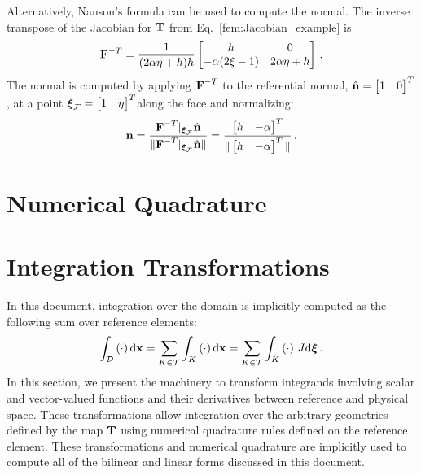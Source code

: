 \documentclass[../doc.tex]{subfiles}
\begin{document}
Alternatively, Nanson's formula can be used to compute the normal. The inverse transpose of the Jacobian for $\boldsymbol{\mathrm{T}}$ from Eq.~\ref{fem:Jacobian_example} is 
	\begin{equation}
		\boldsymbol{\mathrm{F}}^{-T} = \frac{1}{(2\alpha \eta + h)h} \begin{bmatrix} 
			h & 0 \\ 
			-\alpha(2\xi-1) & 2\alpha\eta+h
		\end{bmatrix} \,. 
	\end{equation}
The normal is computed by applying $\boldsymbol{\mathrm{F}}^{-T}$ to the referential normal, $\hat{\boldsymbol{\mathrm{n}}} = \begin{bmatrix} 1&0 \end{bmatrix}^T$, at a point $\boldsymbol{\xi}_\mathcal{F} = \begin{bmatrix} 1 & \eta \end{bmatrix}^T$along the face and normalizing: 
	\begin{equation}
		\boldsymbol{\mathrm{n}} = \frac{\boldsymbol{\mathrm{F}}^{-T}|_{\boldsymbol{\xi}_\mathcal{F}}\hat{\boldsymbol{\mathrm{n}}}}{\|\boldsymbol{\mathrm{F}}^{-T}|_{\boldsymbol{\xi}_\mathcal{F}}\hat{\boldsymbol{\mathrm{n}}}\|} = \frac{\begin{bmatrix} h & -\alpha \end{bmatrix}^T}{\|\begin{bmatrix} h & -\alpha \end{bmatrix}^T\|} \,. 
	\end{equation}

\section{Numerical Quadrature}

\section{Integration Transformations} \label{fem_sec:int_trans}
In this document, integration over the domain is implicitly computed as the following sum over reference elements: 
	\begin{equation}
		\int_{\mathcal{D}} \left( \cdot \right) \mathop{}\!\mathrm{d} \boldsymbol{\mathrm{x}} = \sum_{K\in\mathcal{T}} \int_K \left( \cdot \right) \mathop{}\!\mathrm{d} \boldsymbol{\mathrm{x}} = \sum_{K\in\mathcal{T}} \int_{\hat{K}} \left( \cdot \right)\,J\!\mathop{}\!\mathrm{d} \boldsymbol{\xi} \,. 
	\end{equation}
In this section, we present the machinery to transform integrands involving scalar and vector-valued functions and their derivatives between reference and physical space. These transformations allow integration over the arbitrary geometries defined by the map $\boldsymbol{\mathrm{T}}$ using numerical quadrature rules defined on the reference element. These transformations and numerical quadrature are implicitly used to compute all of the bilinear and linear forms discussed in this document. 
\end{document}
